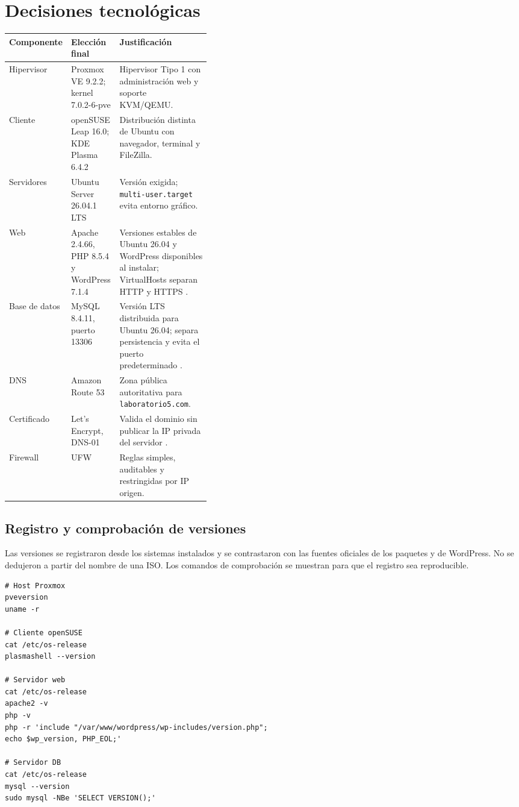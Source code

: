 \section{Decisiones tecnológicas}

\begin{tabularx}{\linewidth}{@{}p{0.15\linewidth} p{0.24\linewidth} Y@{}}
\toprule
\textbf{Componente} & \textbf{Elección final} & \textbf{Justificación} \\
\midrule
Hipervisor & Proxmox VE 9.2.2; kernel 7.0.2-6-pve & Hipervisor Tipo 1 con administración web y soporte KVM/QEMU. \\
Cliente & openSUSE Leap 16.0; KDE Plasma 6.4.2 & Distribución distinta de Ubuntu con navegador, terminal y FileZilla. \\
Servidores & Ubuntu Server 26.04.1 LTS & Versión exigida; \texttt{multi-user.target} evita entorno gráfico. \\
Web & Apache 2.4.66, PHP 8.5.4 y WordPress 7.1.4 & Versiones estables de Ubuntu 26.04 y WordPress disponibles al instalar; VirtualHosts separan HTTP y HTTPS \cite{ubuntu-apache,ubuntu-php,wordpress-releases}. \\
Base de datos & MySQL 8.4.11, puerto 13306 & Versión LTS distribuida para Ubuntu 26.04; separa persistencia y evita el puerto predeterminado \cite{ubuntu-mysql}. \\
DNS & Amazon Route 53 & Zona pública autoritativa para \texttt{laboratorio5.com}. \\
Certificado & Let's Encrypt, DNS-01 & Valida el dominio sin publicar la IP privada del servidor \cite{letsencrypt-challenges}. \\
Firewall & UFW & Reglas simples, auditables y restringidas por IP origen. \\
\bottomrule
\end{tabularx}

\subsection{Registro y comprobación de versiones}

Las versiones se registraron desde los sistemas instalados y se contrastaron con las fuentes oficiales de los paquetes y de WordPress. No se dedujeron a partir del nombre de una ISO. Los comandos de comprobación se muestran para que el registro sea reproducible.

\begin{lstlisting}[caption={Comandos utilizados para comprobar versiones.}]
# Host Proxmox
pveversion
uname -r

# Cliente openSUSE
cat /etc/os-release
plasmashell --version

# Servidor web
cat /etc/os-release
apache2 -v
php -v
php -r 'include "/var/www/wordpress/wp-includes/version.php";
echo $wp_version, PHP_EOL;'

# Servidor DB
cat /etc/os-release
mysql --version
sudo mysql -NBe 'SELECT VERSION();'
\end{lstlisting}

